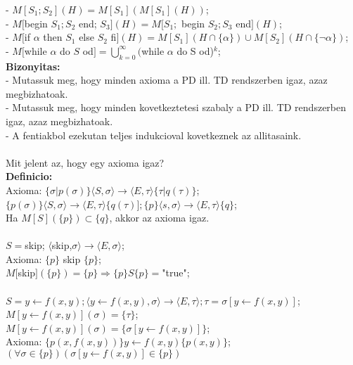 \documentclass[a4paper,10pt]{article}
\begin{document}
- $M[S_1;S_2](H) = M[S_1](M[S_1](H))$;\\
- $M[$begin $S_1; S_2$ end; $S_3](H) = M[S_1;$ begin $S_2; S_3$ end$](H)$;\\
- $M[$if $\alpha$ then $S_1$ else $S_2$ fi$](H) = M[S_1](H\cap \lbrace\alpha\rbrace)\cup M[S_2](H\cap \lbrace\neg\alpha\rbrace)$;\\
- $M[$while $\alpha$ do $S$ od$] = \bigcup_{k=0}^{\infty}($while $\alpha$ do S od)$^k$;\\
\textbf{Bizonyitas:}\\
- Mutassuk meg, hogy minden axioma a PD ill. TD rendszerben igaz, azaz megbizhatoak.\\
- Mutassuk meg, hogy minden kovetkeztetesi szabaly a PD ill. TD	rendszerben igaz, azaz megbizhatoak.\\
- A fentiakbol ezekutan teljes indukcioval kovetkeznek az allitasaink.\\
\\
Mit jelent az, hogy egy axioma igaz?\\
\textbf{Definicio:}\\
Axioma: $\lbrace\sigma\vert p(\sigma)\rbrace \langle S,\sigma\rangle \to \langle E, \tau\rangle \lbrace\tau\vert q(\tau)\rbrace$;\\
$\lbrace p(\sigma)\rbrace \langle S, \sigma\rangle \to \langle E, \tau\rangle \lbrace q(\tau)]; \lbrace p\rbrace \langle s, \sigma\rangle \to \langle E, \tau\rangle \lbrace q\rbrace$;\\
Ha $M[S](\lbrace p\rbrace)\subset \lbrace q\rbrace$, akkor az axioma igaz.\\\\
$S=$skip; $\langle$skip,$ \sigma\rangle \to \langle E, \sigma\rangle$;\\
Axioma: $\lbrace p\rbrace$ skip $\lbrace p\rbrace$;\\
$M[$skip$](\lbrace p\rbrace) = \lbrace p\rbrace\Rightarrow\lbrace p\rbrace S\lbrace p\rbrace =$"true";\\
\\
$S=y\leftarrow f(x,y);\langle y\leftarrow f(x,y),\sigma\rangle\to\langle E,\tau\rangle; \tau=\sigma[y\leftarrow f(x,y)]$;\\
$M[y\leftarrow f(x,y)](\sigma) = \lbrace\tau\rbrace$;\\
$M[y\leftarrow f(x,y)](\sigma) = \lbrace\sigma[y\leftarrow f(x,y)]\rbrace$;\\
Axioma: $\lbrace p(x,f(x,y))\rbrace y\leftarrow f(x,y)\lbrace p(x,y)\rbrace$;\\
\indent $(\forall\sigma\in \lbrace p\rbrace)(\sigma[y\leftarrow f(x,y)]\in\lbrace p\rbrace)$\\
\end{document}
